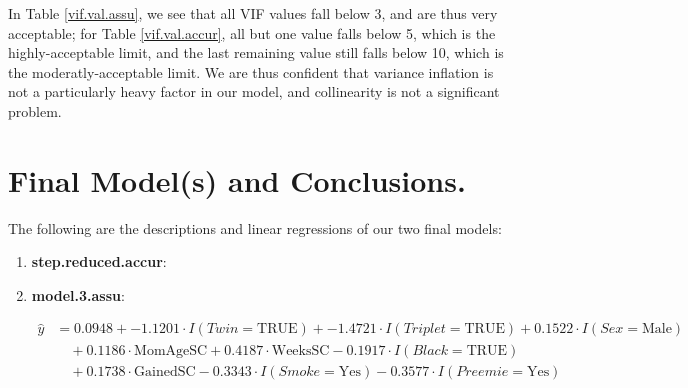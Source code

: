 \documentclass{article}\usepackage[]{graphicx}\usepackage[]{xcolor}
\begin{document}
In Table \ref{vif.val.assu}, we see that all VIF values fall below 3, and are thus very acceptable; for Table \ref{vif.val.accur}, all but one value falls below 5, which is the highly-acceptable limit, and the last remaining value still falls below 10, which is the moderatly-acceptable limit. We are thus confident that variance inflation is not a particularly heavy factor in our model, and collinearity is not a significant problem.

\section{Final Model(s) and Conclusions.}

The following are the descriptions and linear regressions of our two final models:
\begin{enumerate}
\item \textbf{step.reduced.accur}:




\item \textbf{model.3.assu}:



\begin{align*}
\hat{y} &= 0.0948 + -1.1201\cdot I(Twin = \text{TRUE}) + -1.4721\cdot I(Triplet = \text{TRUE}) + 0.1522\cdot I(Sex = \text{Male}) \\ &\quad + 0.1186\cdot \text{MomAgeSC} + 0.4187\cdot \text{WeeksSC} - 0.1917\cdot I(Black = \text{TRUE}) \\ &\quad + 0.1738\cdot \text{GainedSC} - 0.3343\cdot I(Smoke = \text{Yes}) - 0.3577\cdot I(Preemie = \text{Yes})
\end{align*}
\end{enumerate}
\end{document}
